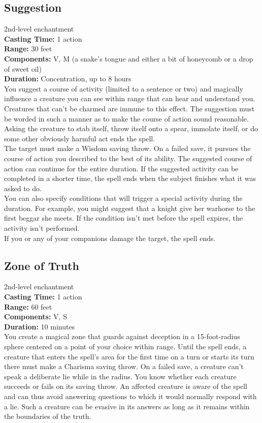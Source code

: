 \documentclass[11pt, A4paper, english]{article}
\begin{document}
		\subsection{Suggestion}
2nd-level enchantment \\
\textbf{Casting Time:} 1 action \\
\textbf{Range:} 30 feet \\
\textbf{Components:} V, M (a snake’s tongue and either a bit of honeycomb or a drop of sweet oil) \\
\textbf{Duration:} Concentration, up to 8 hours \\
You suggest a course of activity (limited to a sentence or two) and magically influence a creature you can see within range that can hear and understand you. Creatures that can’t be charmed are immune to this effect. The suggestion must be worded in such a manner as to make the course of action sound reasonable. Asking the creature to stab itself, throw itself onto a spear, immolate itself, or do some other obviously harmful act ends the spell. \\
The target must make a Wisdom saving throw. On a failed save, it pursues the course of action you described to the best of its ability. The suggested course of action can continue for the entire duration. If the suggested activity can be completed in a shorter time, the spell ends when the subject finishes what it was asked to do. \\
You can also specify conditions that will trigger a special activity during the duration. For example, you might suggest that a knight give her warhorse to the first beggar she meets. If the condition isn’t met before the spell expires, the activity isn’t performed. \\
If you or any of your companions damage the target, the spell ends.

		\subsection{Zone of Truth}
2nd-level enchantment \\
\textbf{Casting Time:} 1 action \\
\textbf{Range:} 60 feet \\
\textbf{Components:} V, S \\
\textbf{Duration:} 10 minutes \\
You create a magical zone that guards against deception in a 15-foot-radius sphere centered on a point of your choice within range. Until the spell ends, a creature that enters the spell’s area for the first time on a turn or starts its turn there must make a Charisma saving throw. On a failed save, a creature can’t speak a deliberate lie while in the radius. You know whether each creature succeeds or fails on its saving throw. An affected creature is aware of the spell and can thus avoid answering questions to which it would normally respond with a lie. Such a creature can be evasive in its answers as long as it remains within the boundaries of the truth.
\end{document}
